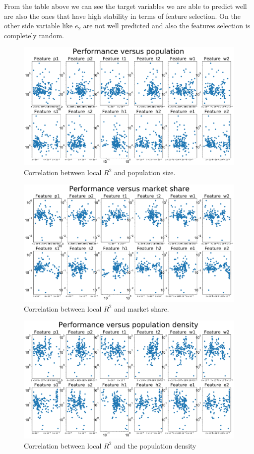 \documentclass[12pt]{article}
\begin{document}
From the table above we can see the target variables we are able to predict well are also the ones that have high stability in terms of feature selection. On the other side variable like $e_2$ are not well predicted and also the features selection is completely random.

\begin{figure}[h!]
    \centering
    \includegraphics[width=1\linewidth]{figures/ppop.pdf}
\caption{Correlation between local $R^2$ and population size.}
\label{fig:ppop}  
\end{figure}

\begin{figure}[h!]
    \centering
    \includegraphics[width=1\linewidth]{figures/pmshare.pdf}
\caption{Correlation between local $R^2$ and market share.}
\label{fig:pmshare}  
\end{figure}

\begin{figure}[h!]
    \centering
    \includegraphics[width=1\linewidth]{figures/popdens.pdf}
\caption{Correlation between local $R^2$ and the population density}
\label{fig:popdens}  
\end{figure}




\clearpage


\end{document}
